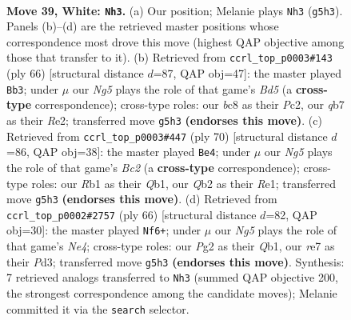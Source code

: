 \documentclass[11pt]{article}
\begin{document}
\clearpage

\begin{figure}[p]\centering
\begin{subfigure}{0.46\textwidth}\centering
\resizebox{\linewidth}{!}{%
\newchessgame
\chessboard[
  setfen={2b3k1/1q2rp1p/6p1/1Bn1PpN1/p4P2/8/PQP2KPP/1R6 w - - 14 39},
  showmover=false,
  pgfstyle=straightmove, color=movearrow, markmove={g5-h3}
]}
\caption{}
\end{subfigure}\hfill
\begin{subfigure}{0.46\textwidth}\centering
\resizebox{\linewidth}{!}{%
\newchessgame
\chessboard[
  setfen={2r3k1/2q2pp1/p2p4/1p1BbP1p/1P5P/P4QP1/2P1R3/3K4 w - - 3 34},
  showmover=false,
  pgfstyle=straightmove, color=movearrow, markmove={d5-b3}
]}
\caption{}
\end{subfigure}
\\[4pt]
\begin{subfigure}{0.46\textwidth}\centering
\resizebox{\linewidth}{!}{%
\newchessgame
\chessboard[
  setfen={r5k1/2p2ppp/1n1p4/1P1b1Nq1/1P1p4/7P/2B2PP1/1Q2R1K1 w - - 0 36},
  showmover=false,
  pgfstyle=straightmove, color=movearrow, markmove={c2-e4}
]}
\caption{}
\end{subfigure}\hfill
\begin{subfigure}{0.46\textwidth}\centering
\resizebox{\linewidth}{!}{%
\newchessgame
\chessboard[
  setfen={r4bk1/q4p2/3p3p/1p1P2p1/1R2Np2/P2P3P/5PP1/1Q4K1 w - - 4 34},
  showmover=false,
  pgfstyle=straightmove, color=movearrow, markmove={e4-f6}
]}
\caption{}
\end{subfigure}
\caption{\textbf{Move 39, White: \texttt{Nh3}.} (a) Our position; Melanie plays \texttt{Nh3} (\texttt{g5h3}). Panels (b)--(d) are the retrieved master positions whose correspondence most drove this move (highest QAP objective among those that transfer to it). (b) Retrieved from \texttt{ccrl\_top\_p0003\#143} (ply 66) [structural distance $d$=87, QAP obj=47]: the master played \texttt{Bb3}; under $\mu$ our \emph{Ng5} plays the role of that game's \emph{Bd5} (a \textbf{cross-type} correspondence); cross-type roles: our \emph{b}c8 as their \emph{P}c2, our \emph{q}b7 as their \emph{R}e2; transferred move \texttt{g5h3} \textbf{(endorses this move)}. (c) Retrieved from \texttt{ccrl\_top\_p0003\#447} (ply 70) [structural distance $d$=86, QAP obj=38]: the master played \texttt{Be4}; under $\mu$ our \emph{Ng5} plays the role of that game's \emph{Bc2} (a \textbf{cross-type} correspondence); cross-type roles: our \emph{R}b1 as their \emph{Q}b1, our \emph{Q}b2 as their \emph{R}e1; transferred move \texttt{g5h3} \textbf{(endorses this move)}. (d) Retrieved from \texttt{ccrl\_top\_p0002\#2757} (ply 66) [structural distance $d$=82, QAP obj=30]: the master played \texttt{Nf6+}; under $\mu$ our \emph{Ng5} plays the role of that game's \emph{Ne4}; cross-type roles: our \emph{P}g2 as their \emph{Q}b1, our \emph{r}e7 as their \emph{P}d3; transferred move \texttt{g5h3} \textbf{(endorses this move)}. Synthesis: 7 retrieved analogs transferred to \texttt{Nh3} (summed QAP objective 200, the strongest correspondence among the candidate moves); Melanie committed it via the \texttt{search} selector.}
\label{fig:thought-m76}
\end{figure}
\end{document}
